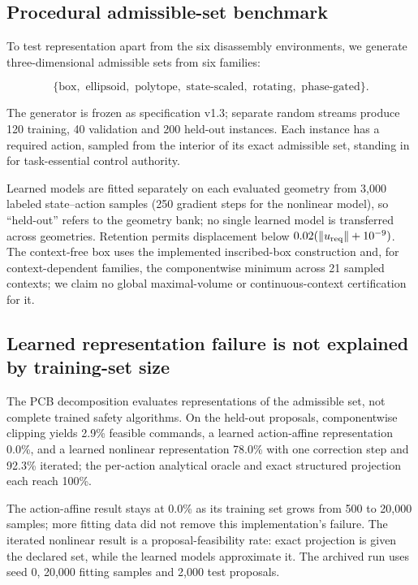 \documentclass[10pt]{article}
\begin{document}
\subsection{Procedural admissible-set benchmark}

To test representation apart from the six disassembly environments, we
generate three-dimensional admissible sets from six families:

\[
\{\text{box},\text{ ellipsoid},\text{ polytope},
  \text{ state-scaled},\text{ rotating},\text{ phase-gated}\}.
\]

The generator is frozen as specification v1.3; separate random streams produce
120 training, 40 validation and 200 held-out instances. Each instance has a
required action, sampled from the interior of its exact admissible set, standing
in for task-essential control authority.

Learned models are fitted separately on each evaluated geometry from 3,000
labeled state--action samples (250 gradient steps for the nonlinear model), so
``held-out'' refers to the geometry bank; no single learned model is transferred across geometries.
Retention permits displacement below
$0.02(\lVert u_{\rm req}\rVert+10^{-9})$. The context-free box uses the
implemented inscribed-box construction and, for context-dependent families,
the componentwise minimum across 21 sampled contexts; we claim no global
maximal-volume or continuous-context certification for it.


\subsection{Learned representation failure is not explained by training-set size}

The PCB decomposition evaluates representations of the admissible set, not
complete trained safety algorithms. On the held-out proposals, componentwise
clipping yields 2.9\% feasible commands, a learned action-affine representation
0.0\%, and a learned nonlinear representation 78.0\% with one correction step
and 92.3\% iterated; the per-action analytical oracle and exact structured
projection each reach 100\%.

The action-affine result stays at 0.0\% as its training set grows from 500 to
20,000 samples; more fitting data did not remove this implementation's failure. The
iterated nonlinear result is a proposal-feasibility rate: exact projection is
given the declared set, while the learned models approximate it. The archived
run uses seed 0, 20,000 fitting samples and 2,000 test proposals.
\end{document}
